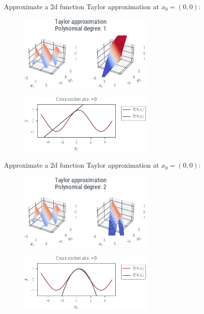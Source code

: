 \documentclass{beamer}
\begin{document}
\begin{frame}{Approximate a 2d function}
    Taylor approximation at $x_0 = (0, 0)$:
    \begin{figure}
        \includegraphics[width=0.6\textwidth]{../figures/laplace-approx/sin2d-taylor-1.pdf}
    \end{figure}
    \begin{figure}
        \includegraphics[width=0.6\textwidth]{../figures/laplace-approx/sin2d-taylor-1d-1.pdf}
    \end{figure}

\end{frame}

\begin{frame}{Approximate a 2d function}
    Taylor approximation at $x_0 = (0, 0)$:
    \begin{figure}
        \includegraphics[width=0.6\textwidth]{../figures/laplace-approx/sin2d-taylor-2.pdf}
    \end{figure}
    \begin{figure}
        \includegraphics[width=0.6\textwidth]{../figures/laplace-approx/sin2d-taylor-1d-2.pdf}
    \end{figure}

\end{frame}
\end{document}
